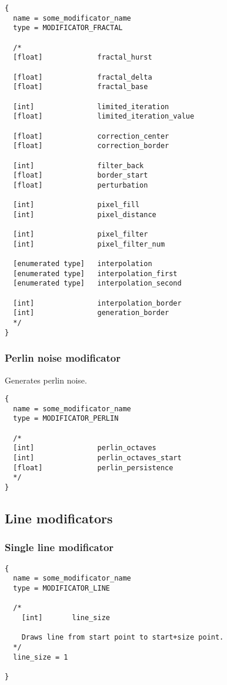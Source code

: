 \documentclass[9pt]{article}
\begin{document}
\begin{verbatim}
{
  name = some_modificator_name
  type = MODIFICATOR_FRACTAL

  /*
  [float]             fractal_hurst

  [float]             fractal_delta
  [float]             fractal_base
  
  [int]               limited_iteration
  [float]             limited_iteration_value
  
  [float]             correction_center
  [float]             correction_border
  
  [int]               filter_back
  [float]             border_start
  [float]             perturbation
  
  [int]               pixel_fill
  [int]               pixel_distance
  
  [int]               pixel_filter
  [int]               pixel_filter_num

  [enumerated type]   interpolation
  [enumerated type]   interpolation_first
  [enumerated type]   interpolation_second
  
  [int]               interpolation_border      
  [int]               generation_border
  */  
}
\end{verbatim}

\subsubsection{Perlin noise modificator}

Generates perlin noise.

\begin{verbatim}
{
  name = some_modificator_name
  type = MODIFICATOR_PERLIN

  /*
  [int]               perlin_octaves
  [int]               perlin_octaves_start
  [float]             perlin_persistence
  */
}
\end{verbatim}

\subsection{Line modificators}
\subsubsection{Single line modificator}

\begin{verbatim}
{
  name = some_modificator_name
  type = MODIFICATOR_LINE

  /*
    [int]       line_size
    
    Draws line from start point to start+size point.
  */
  line_size = 1
  
}
\end{verbatim}
\end{document}
